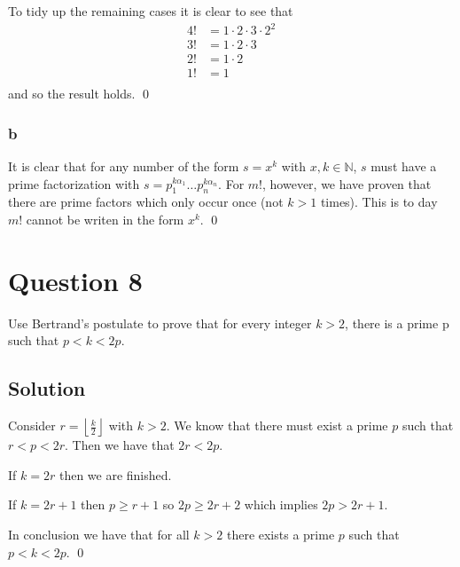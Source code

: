 \documentclass{unswmaths}
\begin{document}
To tidy up the remaining cases it is clear to see that
\begin{align*}
	4! &= 1 \cdot 2 \cdot 3 \cdot 2^2 \\
	3! &= 1 \cdot 2 \cdot 3 \\
	2! &= 1 \cdot 2 \\
	1! &= 1 \\
\end{align*}
and so the result holds.
\qed
\subsubsection*{b}
It is clear that for any number of the form $ s = x^k $ with $ x, k \in \mathbb{N} $,  $ s $ must have a prime
factorization with $ s = p_1^{k\alpha_1} \ldots p_n^{k\alpha_n} $. For $ m! $, however, we have proven that there are prime factors which
only occur once (not $k > 1 $ times). This is to day $ m! $ cannot be writen in the form
$ x^k $. \qed

\section*{Question 8}
Use Bertrand's postulate to prove that for every integer $ k > 2 $, 
there is a prime p such that $ p < k < 2p $.
\subsection*{Solution}
Consider $ r = \left\lfloor \frac{k}{2} \right\rfloor $ with $ k > 2 $.
We know that there must exist a prime $ p $ such that $ r < p < 2r $. 
Then we have that $ 2r < 2p $. 

If $ k = 2r $ then we are finished. 

If $ k = 2r + 1 $ then $ p \geq r + 1 $ so $ 2p \geq 2r + 2 $ which implies $ 2p > 2r + 1 $.

In conclusion we have that for all $ k > 2 $ there exists a prime $ p $ such that 
$ p < k < 2p $. \qed
\end{document}
